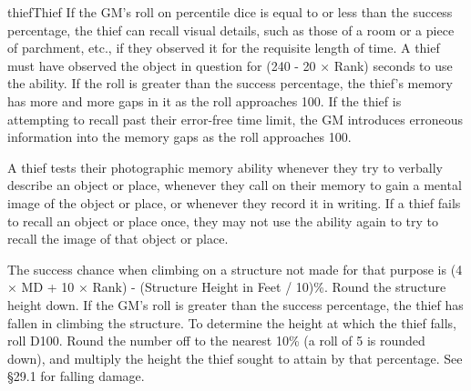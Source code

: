 \begin{Skill}[1.2]{thief}{Thief}
If the GM’s roll on percentile dice is equal to or less than the
success percentage, the thief can recall visual details, such as those
of a room or a piece of parchment, etc., if they observed it for the
requisite length of time.  A thief must have observed the object in
question for (240 - 20 × Rank) seconds to use the ability. If the roll
is greater than the success percentage, the thief’s memory has more
and more gaps in it as the roll approaches 100.  If the thief is
attempting to recall past their error-free time limit, the GM
introduces erroneous information into the memory gaps as the roll
approaches 100.

A thief tests their photographic memory ability whenever they try to
verbally describe an object or place, whenever they call on their
memory to gain a mental image of the object or place, or whenever they
record it in writing. If a thief fails to recall an object or place
once, they may not use the ability again to try to recall the image of
that object or place.



The success chance when climbing on a structure not made for that
purpose is (4 × MD + 10 × Rank) - (Structure Height in Feet / 10)\%.
Round the structure height down.  If the GM’s roll is greater than the
success percentage, the thief has fallen in climbing the structure.
To determine the height at which the thief falls, roll D100. Round the
number off to the nearest 10\% (a roll of 5 is rounded down), and
multiply the height the thief sought to attain by that percentage.
See §29.1 for falling damage.

\end{Skill}
